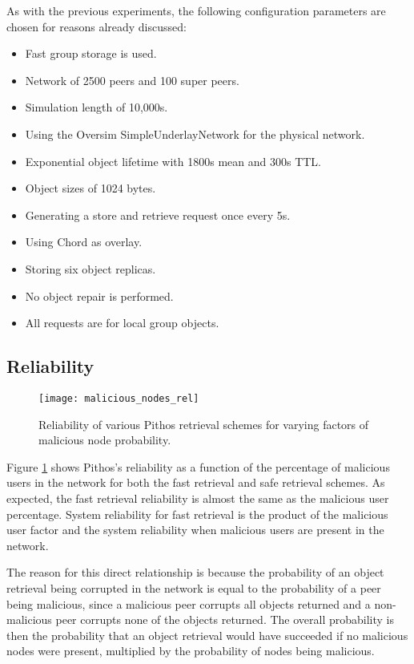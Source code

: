 As with the previous experiments, the following configuration parameters are chosen for reasons already discussed:
%
\begin{itemize}
\item Fast group storage is used.
\item Network of 2500 peers and 100 super peers.
\item Simulation length of 10,000s.
\item Using the Oversim SimpleUnderlayNetwork for the physical network.
\item Exponential object lifetime with 1800s mean and 300s TTL.
\item Object sizes of 1024 bytes.
\item Generating a store and retrieve request once every 5s.
\item Using Chord as overlay.
\item Storing six object replicas.
\item No object repair is performed.
\item All requests are for local group objects.
\end{itemize}

\subsection{Reliability}
\begin{figure}[htbp]
 \centering
 \texttt{[image: malicious\_nodes\_rel]}
 \caption{Reliability of various Pithos retrieval schemes for varying factors of malicious node probability.}
 \label{fig_malicious_nodes_rel}
\end{figure}
%
Figure \ref{fig_malicious_nodes_rel} shows Pithos's reliability as a function of the percentage of malicious users in the network for both the fast retrieval and safe retrieval schemes. As expected, the fast retrieval reliability is almost the same as the malicious user percentage. System reliability for fast retrieval is the product of the malicious user factor and the system reliability when malicious users are present in the network.

The reason for this direct relationship is because the probability of an object retrieval being corrupted in the network is equal to the probability of a peer being malicious, since a malicious peer corrupts all objects returned and a non-malicious peer corrupts none of the objects returned. The overall probability is then the probability that an object retrieval would have succeeded if no malicious nodes were present, multiplied by the probability of nodes being malicious.

